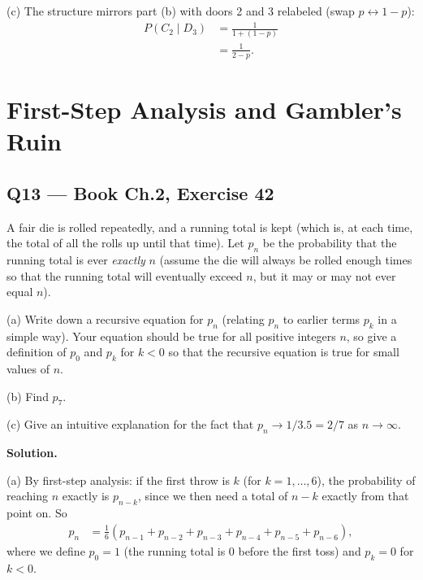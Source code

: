 \documentclass[11pt]{article}
\begin{document}
(c) The structure mirrors part (b) with doors 2 and 3 relabeled (swap $p \leftrightarrow 1-p$):
\begin{align*}
P(C_2\mid D_3) &= \frac{1}{1+(1-p)} \\
&= \frac{1}{2-p}.
\end{align*}

\section{First-Step Analysis and Gambler's Ruin}

\subsection*{Q13 --- Book Ch.2, Exercise 42}
\begin{qbox}
A fair die is rolled repeatedly, and a running total is kept (which is, at each time, the total of all the rolls up until that time). Let $p_n$ be the probability that the running total is ever \textit{exactly} $n$ (assume the die will always be rolled enough times so that the running total will eventually exceed $n$, but it may or may not ever equal $n$).

(a) Write down a recursive equation for $p_n$ (relating $p_n$ to earlier terms $p_k$ in a simple way). Your equation should be true for all positive integers $n$, so give a definition of $p_0$ and $p_k$ for $k<0$ so that the recursive equation is true for small values of $n$.

(b) Find $p_7$.

(c) Give an intuitive explanation for the fact that $p_n \to 1/3.5 = 2/7$ as $n \to \infty$.
\end{qbox}
\textbf{Solution.}

(a) By first-step analysis: if the first throw is $k$ (for $k=1,\dots,6$), the probability of reaching $n$ exactly is $p_{n-k}$, since we then need a total of $n-k$ exactly from that point on. So
\begin{align*}
p_n &= \frac16\left(p_{n-1}+p_{n-2}+p_{n-3}+p_{n-4}+p_{n-5}+p_{n-6}\right),
\end{align*}
where we define $p_0 = 1$ (the running total is 0 before the first toss) and $p_k = 0$ for $k<0$.
\end{document}
